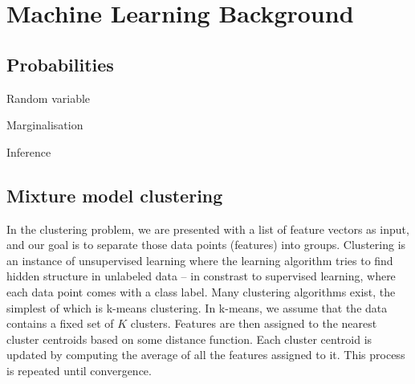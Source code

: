 \chapter{Machine Learning Background}
\label{c:ml-background}


\section{Probabilities}

Random variable

Marginalisation

Inference

\section{Mixture model clustering}


In the clustering problem, we are presented with a list of feature vectors as input, and our goal is to separate those data points (features) into groups. Clustering is an instance of unsupervised learning where the learning algorithm tries to find hidden structure in unlabeled data -- in constrast to supervised learning, where each data point comes with a class label. Many clustering algorithms exist, the simplest of which is k-means clustering. In k-means, we assume that the data contains a fixed set of $K$ clusters. Features are then assigned to the nearest cluster centroids based on some distance function. Each cluster centroid is updated by computing the average of all the features assigned to it. This process is repeated until convergence. 

